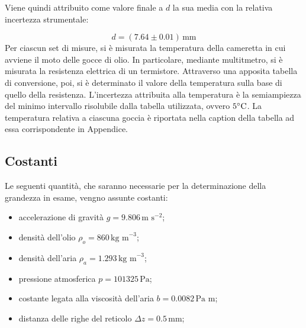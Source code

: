 \documentclass[]{article}
\let\oldsubsection\subsection%
\renewcommand{\subsection}{%
	\renewcommand{\theequation}{\thesubsection.\arabic{equation}}%
	\oldsubsection}%
\begin{document}
    Viene quindi attribuito come valore finale a $ d $ la sua media con la relativa incertezza strumentale:

    \begin{equation}
        \label{misura_Rb}
        d = (7.64 \pm 0.01) \, \text{mm}
    \end{equation} 
    Per ciascun set di misure, si è misurata la temperatura della cameretta in cui avviene il moto delle gocce di olio. In particolare, mediante multitmetro, si è misurata la resistenza elettrica di un termistore. Attraverso una apposita tabella di conversione, poi, si è determinato il valore della temperatura sulla base di quello della resistenza. L'incertezza attribuita alla temperatura è la semiampiezza del minimo intervallo risolubile dalla tabella utilizzata, ovvero $5 \degree \text{C}$.
    La temperatura relativa a ciascuna goccia è riportata nella caption della tabella ad essa corrispondente in Appendice.

    \subsection {Costanti}
    \label{par:costanti}

    Le seguenti quantità, che saranno necessarie per la determinazione della grandezza in esame, vengno assunte costanti:
    \begin{itemize}
        \item accelerazione di gravità $g = 9.806 \, \text{m s}^{-2}$;
        \item densità dell'olio $\rho_o = 860 \, \text{kg m}^{-3}$;
        \item densità dell'aria $\rho_a = 1.293 \, \text{kg m}^{-3}$;
        \item pressione atmosferica $ p = 101325 \, \text{Pa}$;
        \item costante legata alla viscosità dell'aria $b = 0.0082 \,  \text{Pa m}$;
        \item distanza delle righe del reticolo $ \Delta z = 0.5 \, \text{mm}$;
    \end{itemize}
\end{document}
